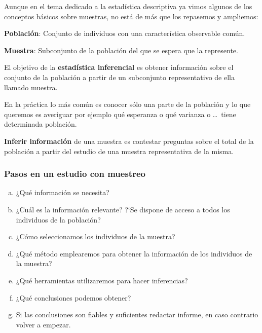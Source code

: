 \documentclass[12pt]{report}
\begin{document}
  Aunque en el tema  dedicado a   la estadística descriptiva ya vimos
  algunos de los conceptos básicos sobre muestras, no está de más
  que los repasemos y ampliemos:

  \begin{description}

  \item \textbf{Población}: Conjunto de individuos con una característica observable
  común.

  \item \textbf{Muestra}: Subconjunto de la población del que se espera que la
  represente.
\end{description}

  El objetivo de la \textbf{estadística inferencial} es obtener
  información sobre el conjunto de la población a partir de un
  subconjunto representativo de ella llamado muestra.

  En la práctica lo más común es conocer sólo una parte de  la
  población y lo que queremos es averiguar por ejemplo qu\'e esperanza o
  qué varianza o \ldots\  tiene determinada población.
 \begin{description}
\item \textbf{Inferir información} de una muestra es contestar
  preguntas sobre
  el total de la población a partir del estudio de una muestra
  representativa de la misma.
\end{description}
  \subsubsection{Pasos en un estudio con muestreo}

  \begin{enumerate}[a)]
      \item ¿Qué información se necesita?
      \item ¿Cuál es la información relevante? ?`Se dispone de acceso
      a todos los individuos de la población?
      \item ¿Cómo seleccionamos los individuos de la muestra?
      \item ¿Qué método emplearemos para obtener la información de
      los individuos de la muestra?
      \item ¿Qué herramientas  utilizaremos para hacer inferencias?
      \item  ¿Qué conclusiones podemos obtener?
      \item   Si las conclusiones son fiables y suficientes
      redactar informe, en caso contrario  volver a empezar.
   \end{enumerate}
\end{document}
